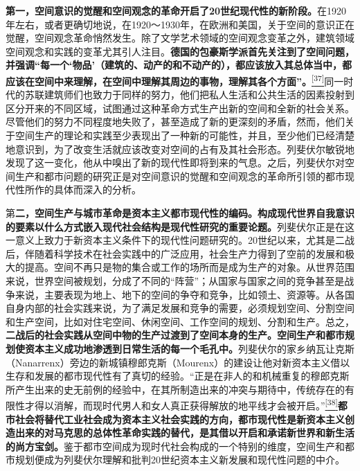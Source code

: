 \documentclass[UTF8, fontset = sourcesans, a4paper, oneside, zihao =
-4, scheme=chinese, no-math, space=true]{ctexbook}
\begin{document}
\textbf{第一，空间意识的觉醒和空间观念的革命开启了20世纪现代性的新阶段。}在1920年左右，或者更确切地说，在1920～1930年，在欧洲和美国，关于空间的意识正在觉醒，空间观念革命悄然发生。除了文学艺术领域的空间观念变革之外，建筑领域空间观念和实践的变革尤其引人注目。\textbf{德国的包豪斯学派首先关注到了空间问题，并强调``每一个`物品'（建筑的、动产的和不动产的），都应该放入其总体当中，都应该在空间中来理解，在空间中理解其周边的事物，理解其各个方面''。}\protect\hypertarget{part0005_split_002.htmlux5cux23w37}{}{}\protect\hyperlink{part0005_split_003.htmlux5cux23m37}{\textsuperscript{{[}37{]}}}同一时代的苏联建筑师们也致力于同样的努力，他们把私人生活和公共生活的因素投射到区分开来的不同区域，试图通过这种革命方式生产出新的空间和全新的社会关系。尽管他们的努力不同程度地失败了，甚至造成了新的更深刻的矛盾，然而，他们关于空间生产的理论和实践至少表现出了一种新的可能性，并且，至少他们已经清楚地意识到，为了改变生活就应该改变对空间的占有及其社会形态。列斐伏尔敏锐地发现了这一变化，他从中嗅出了新的现代性即将到来的气息。之后，列斐伏尔对空间生产和都市问题的研究正是对空间意识的觉醒和空间观念的革命所引领的都市现代性所作的具体而深入的分析。

第\textbf{二，空间生产与城市革命是资本主义都市现代性的编码。构成现代世界自我意识的要素以什么方式嵌入现代社会结构是现代性研究的重要论题。}列斐伏尔正是在这一意义上致力于新资本主义条件下的现代性问题研究的。20世纪以来，尤其是二战后，伴随着科学技术在社会实践中的广泛应用，社会生产力得到了空前的发展和极大的提高。空间不再只是物的集合或工作的场所而是成为生产的对象。从世界范围来说，世界空间被规划，分成了不同的``阵营''；从国家与国家之间的竞争甚至是战争来说，主要表现为地上、地下的空间的争夺和竞争，比如领土、资源等。从各国自身内部的社会实践来说，为了满足发展和竞争的需要，必须规划空间、分割空间和生产空间，比如对住宅空间、休闲空间、工作空间的规划、分割和生产。总之，\textbf{二战后的社会实践从空间中物的生产过渡到了空间本身的生产。空间生产和都市规划使资本主义成功地渗透到日常生活的每一个毛孔中。}列斐伏尔的家乡纳瓦让克斯（Nanarrenx）旁边的新城镇穆郎克斯（Mourenx）的建设让他对新资本主义借以生存和发展的都市现代性有了真切的经验。``正是在非人的和机械重复的穆郎克斯所产生出来的史无前例的经验中，在其所制造出来的冲突与期待中，传统存在的有限性才得以消解，而现时代男人和女人真正获得解放的地平线才会被开启。''\protect\hypertarget{part0005_split_002.htmlux5cux23w38}{}{}\protect\hyperlink{part0005_split_003.htmlux5cux23m38}{\textsuperscript{{[}38{]}}}\textbf{都市社会将替代工业社会成为资本主义社会实践的方向，都市现代性是新资本主义创造出来的对马克思的总体性革命实践的替代，是其借以开启和承诺新世界和新生活的尚方宝剑。}鉴于都市空间成为现时代社会构成的一个特别的维度，空间生产和都市规划便成为列斐伏尔理解和批判20世纪资本主义新发展和现代性问题的中介。
\end{document}
